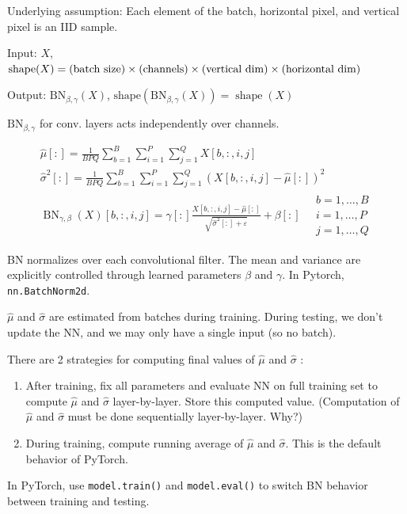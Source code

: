 \documentclass{report}
\begin{document}
\begin{definition}
    Underlying assumption: Each element of the batch, horizontal pixel, and vertical pixel is an IID sample.

    Input: $X$, $\text{shape}(X) =\\\text{(batch size)} \times \text{(channels)} \times \text{(vertical dim)} \times \text{(horizontal dim)}$

    Output: $\mathrm{BN}_{\beta, \gamma}(X)$, $\text{shape} \left(\mathrm{BN}_{\beta, \gamma}(X)\right)=\operatorname{shape}(X)$

    $\mathrm{BN}_{\beta, \gamma}$ for conv. layers acts independently over channels.

    $$
    \begin{gathered}
    \hat{\mu}[:]=\frac{1}{B P Q} \sum_{b=1}^{B} \sum_{i=1}^{P} \sum_{j=1}^{Q} X[b,:, i, j] \\
    \hat{\sigma}^{2}[:]=\frac{1}{B P Q} \sum_{b=1}^{B} \sum_{i=1}^{P} \sum_{j=1}^{Q}(X[b,:, i, j]-\hat{\mu}[:])^{2} \\
    \operatorname{BN}_{\gamma, \beta}(X)[b,:, i, j]=\gamma[:] \frac{X[b,:, i, j]-\hat{\mu}[:]}{\sqrt{\hat{\sigma}^{2}[:]+\varepsilon}}+\beta[:] \quad \begin{array}{l}
    b=1, \ldots, B \\
    i=1, \ldots, P \\
    j=1, \ldots, Q
    \end{array}
    \end{gathered}
    $$

    BN normalizes over each convolutional filter. The mean and variance are explicitly controlled through learned parameters $\beta$ and $\gamma$. In Pytorch, \verb|nn.BatchNorm2d|.
\end{definition}

\begin{definition}
    $\hat{\mu}$ and $\hat{\sigma}$ are estimated from batches during training. During testing, we don't update the NN, and we may only have a single input (so no batch).

    There are 2 strategies for computing final values of $\hat{\mu}$ and $\hat{\sigma}$ :

    \begin{enumerate}
        \item After training, fix all parameters and evaluate NN on full training set to compute $\hat{\mu}$ and $\hat{\sigma}$ layer-by-layer. Store this computed value. (Computation of $\hat{\mu}$ and $\hat{\sigma}$ must be done sequentially layer-by-layer. Why?)
        \item During training, compute running average of $\hat{\mu}$ and $\hat{\sigma}$. This is the default behavior of PyTorch.
    \end{enumerate}

    In PyTorch, use \verb|model.train()| and \verb|model.eval()| to switch BN behavior between training and testing.
\end{definition}
\end{document}
